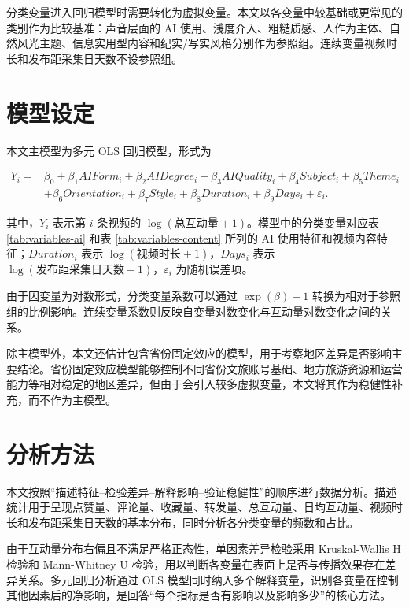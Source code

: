 分类变量进入回归模型时需要转化为虚拟变量。本文以各变量中较基础或更常见的类别作为比较基准：声音层面的 AI 使用、浅度介入、粗糙质感、人作为主体、自然风光主题、信息实用型内容和纪实/写实风格分别作为参照组。连续变量视频时长和发布距采集日天数不设参照组。

\section{模型设定}

本文主模型为多元 OLS 回归模型，形式为
\begin{compactformula}
\begin{equation}
\begin{aligned}
Y_i={}&\beta_0+\beta_1 AIForm_i+\beta_2 AIDegree_i+\beta_3 AIQuality_i
+\beta_4 Subject_i+\beta_5 Theme_i \\
&+\beta_6 Orientation_i+\beta_7 Style_i+\beta_8 Duration_i
+\beta_9 Days_i+\varepsilon_i .
\end{aligned}
\end{equation}
\end{compactformula}
其中，$Y_i$ 表示第 $i$ 条视频的 $\log(\text{总互动量}+1)$。模型中的分类变量对应表 \ref{tab:variables-ai} 和表 \ref{tab:variables-content} 所列的 AI 使用特征和视频内容特征；$Duration_i$ 表示 $\log(\text{视频时长}+1)$，$Days_i$ 表示 $\log(\text{发布距采集日天数}+1)$，$\varepsilon_i$ 为随机误差项。

由于因变量为对数形式，分类变量系数可以通过 $\exp(\beta)-1$ 转换为相对于参照组的比例影响。连续变量系数则反映自变量对数变化与互动量对数变化之间的关系。

除主模型外，本文还估计包含省份固定效应的模型，用于考察地区差异是否影响主要结论。省份固定效应模型能够控制不同省份文旅账号基础、地方旅游资源和运营能力等相对稳定的地区差异，但由于会引入较多虚拟变量，本文将其作为稳健性补充，而不作为主模型。

\section{分析方法}

本文按照“描述特征--检验差异--解释影响--验证稳健性”的顺序进行数据分析。描述统计用于呈现点赞量、评论量、收藏量、转发量、总互动量、日均互动量、视频时长和发布距采集日天数的基本分布，同时分析各分类变量的频数和占比。

由于互动量分布右偏且不满足严格正态性，单因素差异检验采用 Kruskal-Wallis H 检验和 Mann-Whitney U 检验，用以判断各变量在表面上是否与传播效果存在差异关系。多元回归分析通过 OLS 模型同时纳入多个解释变量，识别各变量在控制其他因素后的净影响，是回答“每个指标是否有影响以及影响多少”的核心方法。

